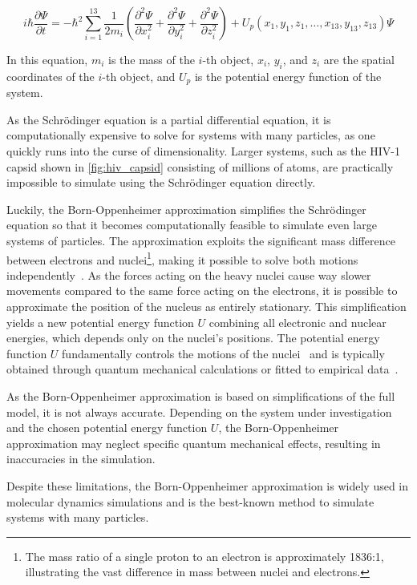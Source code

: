 \begin{equation}
      i \hbar \frac{\partial \Psi}{\partial t} = -\hbar^2 \sum_{i=1}^{13} \frac{1}{2m_i} \left( \frac{\partial^2 \Psi}{\partial x_i^2} + \frac{\partial^2 \Psi}{\partial y_i^2} + \frac{\partial^2 \Psi}{\partial z_i^2} \right) + U_p (x_1, y_1, z_1, \ldots, x_{13}, y_{13}, z_{13}) \Psi
\end{equation}

In this equation, $m_i$ is the mass of the $i$-th object, $x_i$, $y_i$, and $z_i$ are the spatial coordinates of the $i$-th object, and $U_p$ is the potential energy function of the system.
\smallskip

As the Schrödinger equation is a partial differential equation, it is computationally expensive to solve for systems with many particles, as one quickly runs into the curse of dimensionality. Larger systems, such as the HIV-1 capsid shown in \autoref{fig:hiv_capsid} consisting of millions of atoms, are practically impossible to simulate using the Schrödinger equation directly.

Luckily, the Born-Oppenheimer approximation simplifies the Schrödinger equation so that it becomes computationally feasible to simulate even large systems of particles. The approximation exploits the significant mass difference between electrons and nuclei\footnote{
      The mass ratio of a single proton to an electron is approximately 1836:1, illustrating the vast difference in mass between nuclei and electrons.
}, making it possible to solve both motions independently~\cite{Zielinski2013}. As the forces acting on the heavy nuclei cause way slower movements compared to the same force acting on the electrons, it is possible to approximate the position of the nucleus as entirely stationary. This simplification yields a new potential energy function $U$ combining all electronic and nuclear energies, which depends only on the nuclei's positions.
The potential energy function $U$ fundamentally controls the motions of the nuclei~\cite{Zielinski2013} and is typically obtained through quantum mechanical calculations or fitted to empirical data~\cite{Irikura2021}.

As the Born-Oppenheimer approximation is based on simplifications of the full model, it is not always accurate. Depending on the system under investigation and the chosen potential energy function $U$, the Born-Oppenheimer approximation may neglect specific quantum mechanical effects, resulting in inaccuracies in the simulation.

Despite these limitations, the Born-Oppenheimer approximation is widely used in molecular dynamics simulations and is the best-known method to simulate systems with many particles.

